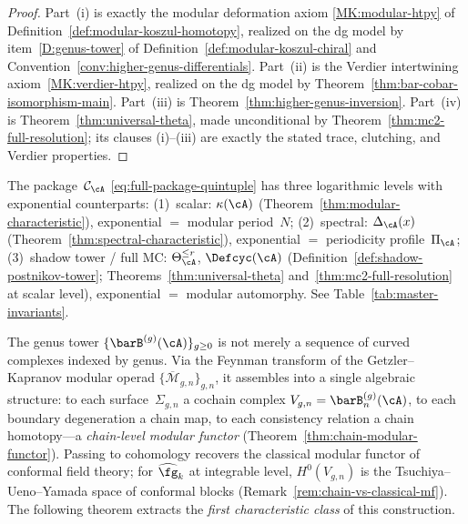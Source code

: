 \begin{proof}
Part~\textup{(i)} is exactly the modular deformation axiom
\textup{\ref{MK:modular-htpy}} of
Definition~\ref{def:modular-koszul-homotopy}, realized on the dg model
by item~\textup{\ref{D:genus-tower}} of
Definition~\ref{def:modular-koszul-chiral} and
Convention~\ref{conv:higher-genus-differentials}.  Part~\textup{(ii)} is
the Verdier intertwining axiom~\textup{\ref{MK:verdier-htpy}}, realized
on the dg model by
Theorem~\ref{thm:bar-cobar-isomorphism-main}.  Part~\textup{(iii)} is
Theorem~\ref{thm:higher-genus-inversion}.  Part~\textup{(iv)} is
Theorem~\ref{thm:universal-theta}, made unconditional by
Theorem~\ref{thm:mc2-full-resolution}; its clauses
\textup{(i)}--\textup{(iii)} are exactly the stated trace, clutching,
and Verdier properties.
\end{proof}

\begin{remark}
\label{rem:modular-characteristic-package}
\label{rem:characteristic-hierarchy}
The package~$\mathcal{C}_{\cA}$ \eqref{eq:full-package-quintuple}
has three logarithmic levels with exponential counterparts:
(1)~scalar: $\kappa(\cA)$ (Theorem~\ref{thm:modular-characteristic}),
exponential $=$ modular period~$N$;
(2)~spectral: $\Delta_{\cA}(x)$
(Theorem~\ref{thm:spectral-characteristic}),
exponential $=$ periodicity profile~$\Pi_{\cA}$;
(3)~shadow tower / full MC: $\Theta_{\cA}^{\leq r}$, $\Defcyc(\cA)$
(Definition~\ref{def:shadow-postnikov-tower};
Theorems~\ref{thm:universal-theta} and~\ref{thm:mc2-full-resolution}
at scalar level),
exponential $=$ modular automorphy.
See Table~\ref{tab:master-invariants}.
\end{remark}

\medskip
The genus tower $\{\barB^{(g)}(\cA)\}_{g \geq 0}$ is not merely a
sequence of curved complexes indexed by genus.  Via the Feynman
transform of the Getzler--Kapranov modular operad
$\{\overline{\mathcal{M}}_{g,n}\}_{g,n}$, it assembles into a
single algebraic structure: to each surface~$\Sigma_{g,n}$ a
cochain complex $V_{g,n} = \barB^{(g)}_n(\cA)$, to each boundary
degeneration a chain map, to each consistency relation a chain
homotopy---a \emph{chain-level modular functor}
(Theorem~\ref{thm:chain-modular-functor}).  Passing to cohomology
recovers the classical modular functor of conformal field theory;
for $\widehat{\fg}_k$ at integrable level, $H^0(V_{g,n})$ is the
Tsuchiya--Ueno--Yamada space of conformal blocks
(Remark~\ref{rem:chain-vs-classical-mf}).  The following theorem
extracts the \emph{first characteristic class} of this
construction.

